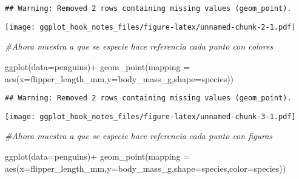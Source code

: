 \documentclass[
]{article}
\newenvironment{Shaded}{\begin{snugshade}}{\end{snugshade}}
\newcommand{\AttributeTok}[1]{\textcolor[rgb]{0.77,0.63,0.00}{#1}}
\newcommand{\CommentTok}[1]{\textcolor[rgb]{0.56,0.35,0.01}{\textit{#1}}}
\newcommand{\FunctionTok}[1]{\textcolor[rgb]{0.00,0.00,0.00}{#1}}
\newcommand{\NormalTok}[1]{#1}
\newcommand{\SpecialCharTok}[1]{\textcolor[rgb]{0.00,0.00,0.00}{#1}}
\begin{document}
\begin{verbatim}
## Warning: Removed 2 rows containing missing values (geom_point).
\end{verbatim}

\texttt{[image: ggplot\_hook\_notes\_files/figure-latex/unnamed-chunk-2-1.pdf]}

\begin{Shaded}
\begin{Highlighting}[]
\CommentTok{\#Ahora muestra a que se especie hace referencia cada punto con colores}
\end{Highlighting}
\end{Shaded}

\begin{Shaded}
\begin{Highlighting}[]
\FunctionTok{ggplot}\NormalTok{(}\AttributeTok{data=}\NormalTok{penguins)}\SpecialCharTok{+}
  \FunctionTok{geom\_point}\NormalTok{(}\AttributeTok{mapping =} \FunctionTok{aes}\NormalTok{(}\AttributeTok{x=}\NormalTok{flipper\_length\_mm,}\AttributeTok{y=}\NormalTok{body\_mass\_g,}\AttributeTok{shape=}\NormalTok{species))}
\end{Highlighting}
\end{Shaded}

\begin{verbatim}
## Warning: Removed 2 rows containing missing values (geom_point).
\end{verbatim}

\texttt{[image: ggplot\_hook\_notes\_files/figure-latex/unnamed-chunk-3-1.pdf]}

\begin{Shaded}
\begin{Highlighting}[]
\CommentTok{\#Ahora muestra a que se especie hace referencia cada punto con figuras}
\end{Highlighting}
\end{Shaded}

\begin{Shaded}
\begin{Highlighting}[]
\FunctionTok{ggplot}\NormalTok{(}\AttributeTok{data=}\NormalTok{penguins)}\SpecialCharTok{+}
  \FunctionTok{geom\_point}\NormalTok{(}\AttributeTok{mapping =} \FunctionTok{aes}\NormalTok{(}\AttributeTok{x=}\NormalTok{flipper\_length\_mm,}\AttributeTok{y=}\NormalTok{body\_mass\_g,}\AttributeTok{shape=}\NormalTok{species,}\AttributeTok{color=}\NormalTok{species))}
\end{Highlighting}
\end{Shaded}
\end{document}
